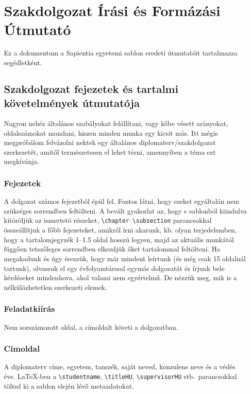 \documentclass{sapientia-thesis}
\begin{document}
\chapter{Szakdolgozat Írási és Formázási Útmutató}
Ez a dokumentum a Sapientia egyetemi sablon eredeti útmutatóit tartalmazza segédletként.

\section{Szakdolgozat fejezetek és tartalmi követelmények útmutatója}
Nagyon nehéz általános szabályokat felállítani, vagy kőbe vésett arányokat, oldalszámokat mondani, hiszen minden munka egy kicsit más. Itt mégis megpróbálom felvázolni nektek egy általános diplomaterv/szakdolgozat szerkezetét, amitől természetesen el lehet térni, amennyiben a téma ezt megkívánja.

\subsection{Fejezetek}
A dolgozat számos fejezetbõl épül fel. Fontos látni, hogy ezeket egyáltalán nem szükséges sorrendben feltölteni. A bevált gyakorlat az, hogy e sablonból kiindulva kitöröljük az ismertetõ részeket, \verb|\chapter|--\verb|\subsection| parancsokkal összeállítjuk a főbb fejezeteket, amikről írni akarunk, kb. olyan terjedelemben, hogy a tartalomjegyzék 1--1.5 oldal hosszú legyen, majd az aktuális munkától függően tetszőleges sorrendben elkezdjük őket tartalommal feltölteni. Ha megakadunk és úgy érezzük, hogy már mindent leírtunk (és még csak 15 oldalnál tartunk), olvassuk el egy évfolyamtárssal egymás dolgozatát és írjunk bele kérdéseket mindenhova, ahol valami nem egyértelmű. De nézzük meg, mik is a nélkülözhetetlen szerkezeti elemek.

\subsection{Feladatkiírás}
Nem sorszámozott oldal, a címoldalt követi a dolgozatban.

\subsection{Címoldal}
A diplomaterv címe, egyetem, tanszék, saját neved, konzulens neve és a védés éve. \LaTeX-ben a \verb|\studentname|, \verb|\titleHU|, \verb|\supervisorHU| stb.\ parancsokkal töltsd ki a sablon elején lévő metaadatokat.
\end{document}
